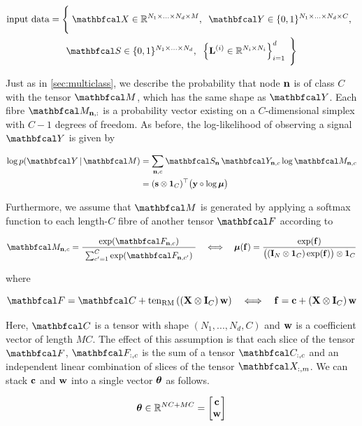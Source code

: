 \begin{multline*}
    \text{input data} = \Bigg\{\;\Xt \in \R^{N_1 \times ... \times N_d \times M}, \;\; \Yt \in \{0, 1\}^{N_1 \times ... \times N_d \times C}, \;\; \\ 
    \St \in \{0, 1\}^{N_1 \times ... \times N_d} , \;\; \left\{\LL^{(i)} \in \R^{N_i \times N_i}\right\}_{i=1}^d \; \Bigg\}
\end{multline*}

Just as in \cref{sec:multiclass}, we describe the probability that node $\mathbf{n}$ is of class $C$ with the tensor $\Mt$, which has the same shape as $\Yt$. Each fibre $\Mt_{\nn, :}$ is a probability vector existing on a $C$-dimensional simplex with $C - 1$ degrees of freedom. As before, the log-likelihood of observing a signal $\Yt$ is given by 

\begin{align}
   \log p(\Yt \, | \, \Mt) &= \sum_{\nn, c} \St_{\nn} \, \Yt_{\nn, c} \log \Mt_{\nn, c} \notag \\
   &= (\s \otimes \one_C)^\top \big(\y \circ \log \muu \big)
\end{align}

Furthermore, we assume that $\Mt$ is generated by applying a softmax function to each length-$C$ fibre of another tensor $\Ft$ according to

\begin{equation}
    \Mt_{\nn, c} = \frac{\exp(\Ft_{\nn, c})}{ \raisebox{-0.1cm} { $\sum_{c'=1}^C \exp(\Ft_{\nn, c'})$ }}  \quad \Longleftrightarrow \quad \muu(\f) = \frac{\exp(\f)}{ \big((\I_N \otimes \one_C) \exp(\f)\big) \otimes \one_C}
\end{equation}

where 

\begin{equation}
    \Ft = \Ct + \tenrm{\left(\X \otimes \I_C \right) \w} \quad \Longleftrightarrow \quad \f = \cc + \left(\X \otimes \I_C \right) \w
\end{equation}
    
Here, $\Ct$ is a tensor with shape $(N_1, ..., N_d, C)$ and $\mathbf{w}$ is a coefficient vector of length $MC$. The effect of this assumption is that each slice of the tensor $\Ft$, $\Ft_{:, c}$ is the sum of a tensor $\Ct_{:, c}$ and an independent linear combination of slices of the tensor $\Xt_{:, m}$. We can stack $\mathbf{c}$ and $\mathbf{w}$ into a single vector $\boldsymbol{\theta}$ as follows. 

\begin{equation}
    \boldsymbol{\theta} \in \mathbb{R}^{NC + MC} = \begin{bmatrix}
        \mathbf{c} \\ \mathbf{w}
    \end{bmatrix}
\end{equation}

